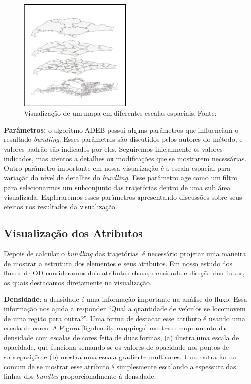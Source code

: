 \begin{figure}[!htb]
  \centering
  \includegraphics[width=55mm]{../figuras/multi-scale.png}
  \caption[Visualização de um mapa em diferentes escalas espaciais]{Visualização de um mapa em diferentes escalas espaciais. Fonte: \citet{Zeng2013}}
  \label{fig:multi-scale}
\end{figure}

\textbf{Parâmetros:} o algoritmo ADEB possui alguns parâmetros que
influenciam o resultado \emph{bundling}. Esses parâmetros são discutidos pelos
autores do método, e valores padrão são indicados por eles. Seguiremos
inicialmente os valores indicados, mas atentos a detalhes ou modificações que
se mostrarem necessárias. Outro parâmetro importante em nossa visualização é a
escala espacial para variação do nível de detalhes do \emph{bundling}. Esse
parâmetro age como um filtro para selecionarmos um subconjunto das trajetórias
dentro de uma sub área visualizada. Exploraremos esses parâmetros apresentando
discussões sobre seus efeitos nos resultados da visualização.

\subsection{Visualização dos Atributos}
Depois de calcular o \emph{bundling} das trajetórias, é necessário projetar uma
maneira de mostrar a estrutura dos elementos e seus atributos. Em nosso estudo
dos fluxos de OD consideramos dois atributos chave, densidade e direção dos
fluxos, os quais destacamos diretamente na visualização.

\textbf{Densidade}: a densidade é uma informação importante na análise do
fluxo. Essa informação nos ajuda a responder ``Qual a quantidade de veículos se
locomovem de uma região para outra?''. Uma forma de destacar esse atributo é
usando uma escala de cores. A Figura \ref{fig:density-mappings} mostra o
mapeamento da densidade com escalas de cores feita de duas formas, (a) ilustra
uma escala de opacidade, que funciona somando-se os valores de opacidade nos
pontos de sobreposição e (b) mostra uma escala gradiente multicores. Uma outra
forma comum de se mostrar esse atributo é simplesmente escalando a espessura
das linhas dos \emph{bundles} proporcionalmente à densidade.

